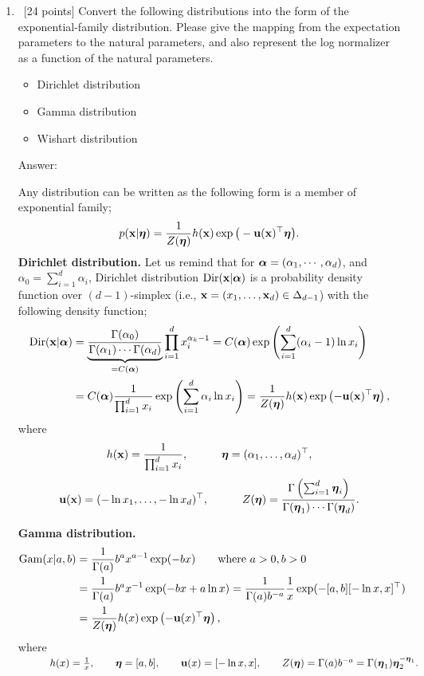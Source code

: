 \documentclass[12pt, fullpage,letterpaper]{article}
\def\red{\color{red}}
\def\blackblue{\color{black!40!blue}}
\begin{document}
\begin{enumerate}
\item~[24 points] Convert the following distributions into the form of the exponential-family distribution. Please give the mapping from the expectation parameters to the natural parameters, and also represent the log normalizer as a function of the natural parameters.
\begin{itemize}
	\item Dirichlet distribution
	\item Gamma distribution
	\item Wishart distribution
\end{itemize}
{\red Answer: }{\blackblue 
Any distribution can be written as the following form is a member of exponential family;
\[
p({\bf x}|\boldsymbol{\eta}) = \frac{1}{Z(\boldsymbol{\eta})} h({\bf x})\exp\big(-{\bf u}({\bf x})^\top \boldsymbol{\eta}\big).
\]
{\red \bf Dirichlet distribution.} Let us remind that for $\boldsymbol{\alpha} = (\alpha_1,\cdots,\alpha_d)$,  and $\alpha_0 = \sum_{i=1}^d\alpha_i$, Dirichlet distribution ${\rm Dir}({\bf x}|\boldsymbol{\alpha})$ is a probability density function over $(d-1)$-simplex (i.e.,  ${\bf x}=(x_1,\ldots,{\bf x}_d)\in \Delta_{d-1}$) with the following density function;   
\begin{align*}
{\rm Dir}({\bf x}|\boldsymbol{\alpha}) 
& = \underbrace{\frac{\Gamma(\alpha_0)}{\Gamma(\alpha_1)\cdots\Gamma(\alpha_d)}}_{=C(\boldsymbol{\alpha})}\prod_{i=1}^dx_i^{\alpha_k-1}
 = C(\boldsymbol{\alpha}) \exp\left(\sum_{i=1}^d (\alpha_i-1)\ln x_i\right) \\
& = C(\boldsymbol{\alpha}) \frac{1}{\prod_{i=1}^dx_i}\exp\left(\sum_{i=1}^d \alpha_i\ln x_i\right)  
= \frac{1}{Z(\boldsymbol{\eta})}h({\bf x}) \exp\left(-{\bf u}({\bf x})^\top\boldsymbol{\eta}\right),
\end{align*}
where $$h({\bf x}) = \frac{1}{\prod_{i=1}^dx_i}, \quad\quad\quad \boldsymbol{\eta} =(\alpha_1,\ldots, \alpha_d)^\top,$$
$${\bf u}({\bf x}) = (-\ln x_1,\ldots,-\ln x_d)^\top, \quad\quad\quad Z(\boldsymbol{\eta})= \frac{\Gamma\left(\sum_{i=1}^d\boldsymbol{\eta}_i\right)}{\Gamma(\boldsymbol{\eta}_1)\cdots\Gamma(\boldsymbol{\eta}_d)}.$$ 

{\red \bf Gamma distribution.}
\begin{align*}
{\rm Gam}(x|a,b) 
& = \frac{1}{\Gamma(a)}b^ax^{a-1}\exp(-bx) \quad\quad\mbox{where  $a>0, b>0$}\\
& = \frac{1}{\Gamma(a)}b^ax^{-1}\exp(-bx + a\ln x)  = \frac{1}{\Gamma(a)b^{-a}}\frac{1}{x}\exp(-[a,b][-\ln x,x]^\top) \\
& = \frac{1}{Z(\boldsymbol{\eta})}h(x) \exp\left(-{\bf u}(x)^\top\boldsymbol{\eta}\right),
\end{align*}
where $\quad\quad\quad h(x) = \frac{1}{x}, \quad\quad\boldsymbol{\eta} = [a,b],\quad\quad {\bf u}(x) = [-\ln x,x], \quad\quad Z(\boldsymbol{\eta}) = \Gamma(a)b^{-a} = \Gamma(\boldsymbol{\eta}_1)\boldsymbol{\eta}_2^{-\boldsymbol{\eta}_1}.$


}
\end{enumerate}
\end{document}
